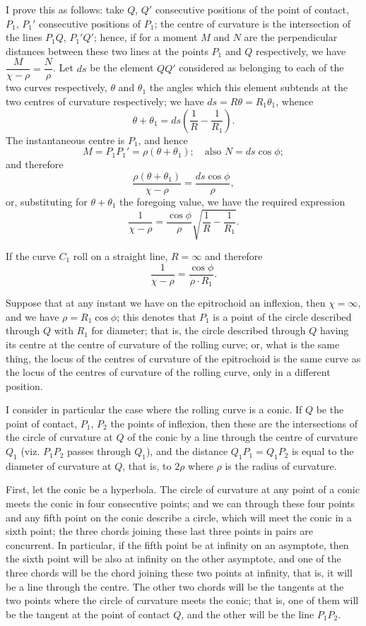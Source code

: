 \documentclass[11pt,a4paper]{book}
\begin{document}
I prove this as follows: take $Q$, $Q'$ consecutive positions of the point of contact, $P_1$, $P_1'$ consecutive positions of $P_1$; the centre of curvature is the intersection of the lines $P_1Q$, $P_1'Q'$; hence, if for a moment $M$ and $N$ are the perpendicular distances between these two lines at the points $P_1$ and $Q$ respectively, we have $\dfrac{M}{\chi - \rho} = \dfrac{N}{\rho}$. Let $ds$ be the element $QQ'$ considered as belonging to each of the two curves respectively, $\theta$ and $\theta_1$ the angles which this element subtends at the two centres of curvature respectively; we have $ds = R\theta = R_1\theta_1$, whence
\[
\theta + \theta_1 = ds\left(\frac{1}{R} - \frac{1}{R_1}\right).
\]
The instantaneous centre is $P_1$, and hence
\[
M = P_1P_1' = \rho(\theta + \theta_1); \quad \text{also } N = ds\cos\phi;
\]
and therefore
\[
\frac{\rho(\theta + \theta_1)}{\chi - \rho} = \frac{ds\cos\phi}{\rho},
\]
or, substituting for $\theta + \theta_1$ the foregoing value, we have the required expression
\[
\frac{1}{\chi - \rho} = \frac{\cos\phi}{\rho}\sqrt{\frac{1}{R} - \frac{1}{R_1}}.
\]

If the curve $C_1$ roll on a straight line, $R = \infty$ and therefore
\[
\frac{1}{\chi - \rho} = \frac{\cos\phi}{\rho \cdot R_1}.
\]

Suppose that at any instant we have on the epitrochoid an inflexion, then $\chi = \infty$, and we have $\rho = R_1\cos\phi$; this denotes that $P_1$ is a point of the circle described through $Q$ with $R_1$ for diameter; that is, the circle described through $Q$ having its centre at the centre of curvature of the rolling curve; or, what is the same thing, the locus of the centres of curvature of the epitrochoid is the same curve as the locus of the centres of curvature of the rolling curve, only in a different position.

I consider in particular the case where the rolling curve is a conic. If $Q$ be the point of contact, $P_1$, $P_2$ the points of inflexion, then these are the intersections of the circle of curvature at $Q$ of the conic by a line through the centre of curvature $Q_1$ (viz. $P_1P_2$ passes through $Q_1$), and the distance $Q_1P_1 = Q_1P_2$ is equal to the diameter of curvature at $Q$, that is, to $2\rho$ where $\rho$ is the radius of curvature.

First, let the conic be a hyperbola. The circle of curvature at any point of a conic meets the conic in four consecutive points; and we can through these four points and any fifth point on the conic describe a circle, which will meet the conic in a sixth point; the three chords joining these last three points in pairs are concurrent. In particular, if the fifth point be at infinity on an asymptote, then the sixth point will be also at infinity on the other asymptote, and one of the three chords will be the chord joining these two points at infinity, that is, it will be a line through the centre. The other two chords will be the tangents at the two points where the circle of curvature meets the conic; that is, one of them will be the tangent at the point of contact $Q$, and the other will be the line $P_1P_2$.
\end{document}
